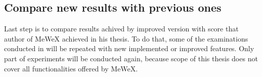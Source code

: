 \subsection{Compare new results with previous ones}
Last step is to compare results achived by improved version with score that author of MeWeX achieved in his thesis.
To do that, some of the examinations conducted in \cite{mgr} will be repeated with new implemented or improved features. 
Only part of experiments will be conducted again, because scope of this thesis does not cover all functionalities offered by MeWeX.